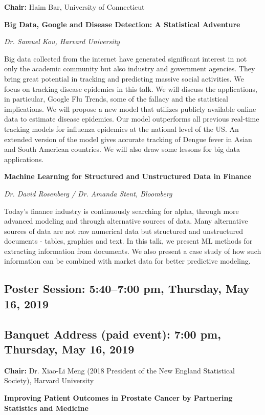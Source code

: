 \documentclass[10pt]{article}
\begin{document}
{\bf Chair:} Haim Bar, University of Connecticut

\noindent
{\bf Big Data, Google and Disease Detection: A Statistical Adventure}

\emph{Dr. Samuel Kou, Harvard University}

Big data collected from the internet have generated significant
interest in not only the academic community but also industry and
government agencies. They bring great potential in tracking and
predicting massive social activities. We focus on tracking disease
epidemics in this talk. We will discuss the applications, in
particular, Google Flu Trends, some of the fallacy and the statistical
implications. We will propose a new model that utilizes publicly
available online data to estimate disease epidemics. Our model
outperforms all previous real-time tracking models for influenza
epidemics at the national level of the US. An extended version of the
model gives accurate tracking of Dengue fever in Asian and South
American countries. We will also draw some lessons for big data
applications.

{\bf Machine Learning for Structured and Unstructured Data in Finance}

\emph{Dr. David Rosenberg / Dr. Amanda Stent, Bloomberg}

Today's finance industry is continuously searching for alpha, through
more advanced modeling and through alternative sources of data. Many
alternative sources of data are not raw numerical data but structured
and unstructured documents - tables, graphics and text. In this talk,
we present ML methods for extracting information from documents. We
also present a case study of how such information can be combined with
market data for better predictive modeling.

\subsection*{Poster Session: \hfill 5:40--7:00 pm, Thursday, May 16,  2019}

\subsection*{Banquet Address (paid event):  \hfill 7:00 pm, Thursday, May 16, 2019}

{\bf Chair:}
Dr. Xiao-Li Meng (2018 President of the New England
Statistical Society), Harvard University

\noindent
{\bf Improving Patient Outcomes in Prostate Cancer by Partnering
  Statistics and Medicine}
\end{document}
